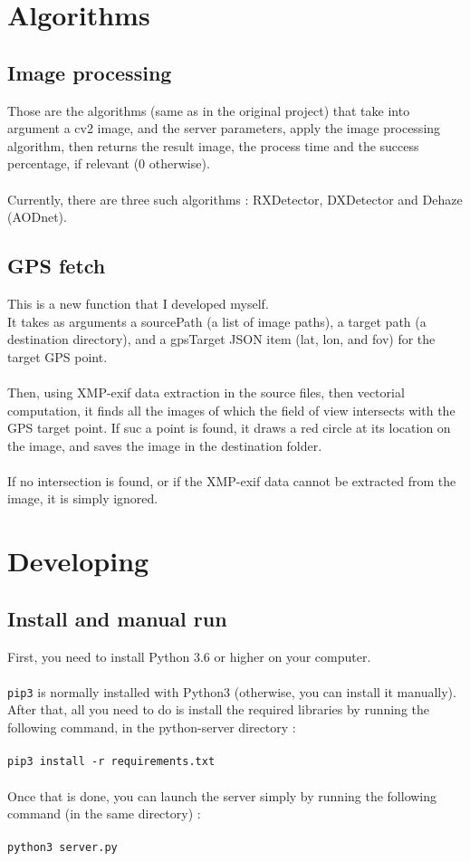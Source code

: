 \documentclass[12pt,a4paper]{article}
\begin{document}
\section{Algorithms}

\subsection{Image processing}

Those are the algorithms (same as in the original project) that take into argument a cv2 image, and the server parameters, apply the image processing algorithm, then returns the result image, the process time and the success percentage, if relevant (0 otherwise).\\
~\\
Currently, there are three such algorithms : RXDetector, DXDetector and Dehaze (AODnet).

\subsection{GPS fetch}
This is a new function that I developed myself.\\
It takes as arguments a sourcePath (a list of image paths), a target path (a destination directory), and a gpsTarget JSON item (lat, lon, and fov) for the target GPS point.\\
~\\
Then, using XMP-exif data extraction in the source files, then vectorial computation, it finds all the images of which the field of view intersects with the GPS target point. If suc a point is found, it draws a red circle at its location on the image, and saves the image in the destination folder.\\
~\\
If no intersection is found, or if the XMP-exif data cannot be extracted from the image, it is simply ignored.

\section{Developing}
\subsection{Install and manual run}
First, you need to install Python 3.6 or higher on your computer.\\
~\\
\texttt{pip3} is normally installed with Python3 (otherwise, you can install it manually). After that, all you need to do is install the required libraries by running the following command, in the python-server directory :\\
~\\
\texttt{pip3 install -r requirements.txt}\\
~\\
Once that is done, you can launch the server simply by running the following command (in the same directory) :\\
~\\
\texttt{python3 server.py}
\end{document}
